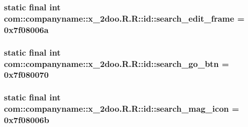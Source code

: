 \hypertarget{classcom_1_1companyname_1_1x__2doo_1_1_r_1_1id_d3040de55e0153bca6647f2f556946c6}{
\subsubsection[{search\_\-edit\_\-frame}]{\setlength{\rightskip}{0pt plus 5cm}static final int com::companyname::x\_\-2doo.R.R::id::search\_\-edit\_\-frame = 0x7f08006a}}
\label{classcom_1_1companyname_1_1x__2doo_1_1_r_1_1id_d3040de55e0153bca6647f2f556946c6}


\hypertarget{classcom_1_1companyname_1_1x__2doo_1_1_r_1_1id_d0917e6063e106e94c742994ce35dd1a}{
\subsubsection[{search\_\-go\_\-btn}]{\setlength{\rightskip}{0pt plus 5cm}static final int com::companyname::x\_\-2doo.R.R::id::search\_\-go\_\-btn = 0x7f080070}}
\label{classcom_1_1companyname_1_1x__2doo_1_1_r_1_1id_d0917e6063e106e94c742994ce35dd1a}


\hypertarget{classcom_1_1companyname_1_1x__2doo_1_1_r_1_1id_61543f6f36a28b1f7602063510cd41b3}{
\subsubsection[{search\_\-mag\_\-icon}]{\setlength{\rightskip}{0pt plus 5cm}static final int com::companyname::x\_\-2doo.R.R::id::search\_\-mag\_\-icon = 0x7f08006b}}
\label{classcom_1_1companyname_1_1x__2doo_1_1_r_1_1id_61543f6f36a28b1f7602063510cd41b3}


